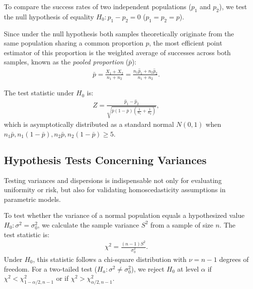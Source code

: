 \begin{teorema}
	To compare the success rates of two independent populations ($p_1$ and $p_2$), we test the null hypothesis of equality $H_0: p_1 - p_2 = 0$ ($p_1 = p_2 = p$).
	
	Since under the null hypothesis both samples theoretically originate from the same population sharing a common proportion $p$, the most efficient point estimator of this proportion is the weighted average of successes across both samples, known as the \emph{pooled proportion} ($\bar{p}$):
	\begin{align}
		\bar{p} = \frac{X_1 + X_2}{n_1 + n_2} = \frac{n_1 \hat{p}_1 + n_2 \hat{p}_2}{n_1 + n_2}.
		\label{eq:prop_combinada}
	\end{align}
	
	The test statistic under $H_0$ is:
	\begin{align}
		Z = \frac{\hat{p}_1 - \hat{p}_2}{\sqrt{\bar{p}(1-\bar{p})\left(\frac{1}{n_1} + \frac{1}{n_2}\right)}},
	\end{align}
	which is asymptotically distributed as a standard normal $N(0,1)$ when $n_1 \bar{p}, n_1(1-\bar{p}), n_2 \bar{p}, n_2(1-\bar{p}) \geq 5$.
\end{teorema}

\subsection{Hypothesis Tests Concerning Variances}

Testing variances and dispersions is indispensable not only for evaluating uniformity or risk, but also for validating homoscedasticity assumptions in parametric models.

\begin{teorema}
	To test whether the variance of a normal population equals a hypothesized value $H_0: \sigma^2 = \sigma_0^2$, we calculate the sample variance $S^2$ from a sample of size $n$. The test statistic is:
	\begin{align}
		\chi^2 = \frac{(n-1)S^2}{\sigma_0^2}.
	\end{align}
	Under $H_0$, this statistic follows a chi-square distribution with $\nu = n - 1$ degrees of freedom.
	For a two-tailed test ($H_a: \sigma^2 \neq \sigma_0^2$), we reject $H_0$ at level $\alpha$ if $\chi^2 < \chi^2_{1-\alpha/2, n-1}$ or if $\chi^2 > \chi^2_{\alpha/2, n-1}$.
\end{teorema}

